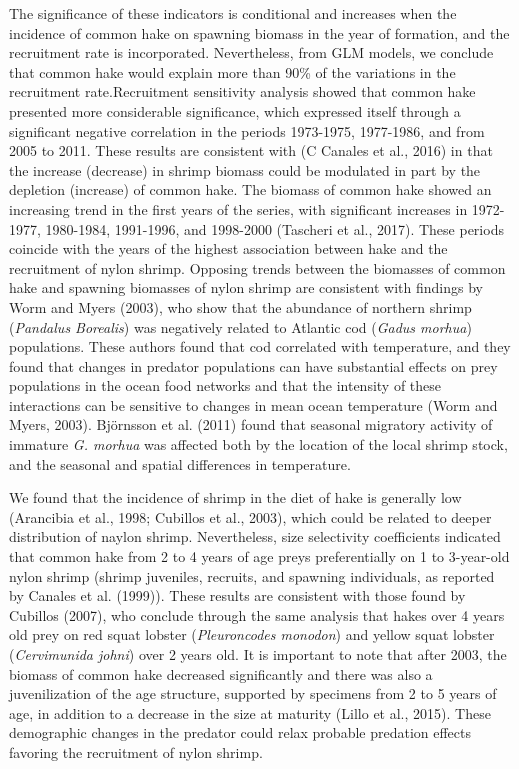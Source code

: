 \documentclass[12pt]{article}
\begin{document}
The significance of these indicators is conditional and increases when
the incidence of common hake on spawning biomass in the year of
formation, and the recruitment rate is incorporated. Nevertheless, from
GLM models, we conclude that common hake would explain more than 90\% of
the variations in the recruitment rate.Recruitment sensitivity analysis
showed that common hake presented more considerable significance, which
expressed itself through a significant negative correlation in the
periods 1973-1975, 1977-1986, and from 2005 to 2011. These results are
consistent with (C Canales et al., 2016) in that the increase (decrease)
in shrimp biomass could be modulated in part by the depletion (increase)
of common hake. The biomass of common hake showed an increasing trend in
the first years of the series, with significant increases in 1972-1977,
1980-1984, 1991-1996, and 1998-2000 (Tascheri et al., 2017). These
periods coincide with the years of the highest association between hake
and the recruitment of nylon shrimp. Opposing trends between the
biomasses of common hake and spawning biomasses of nylon shrimp are
consistent with findings by Worm and Myers (2003), who show that the
abundance of northern shrimp (\emph{Pandalus Borealis}) was negatively
related to Atlantic cod (\emph{Gadus morhua}) populations. These authors
found that cod correlated with temperature, and they found that changes
in predator populations can have substantial effects on prey populations
in the ocean food networks and that the intensity of these interactions
can be sensitive to changes in mean ocean temperature (Worm and Myers,
2003). Björnsson et al. (2011) found that seasonal migratory activity of
immature \emph{G. morhua} was affected both by the location of the local
shrimp stock, and the seasonal and spatial differences in temperature.

We found that the incidence of shrimp in the diet of hake is generally
low (Arancibia et al., 1998; Cubillos et al., 2003), which could be
related to deeper distribution of naylon shrimp. Nevertheless, size
selectivity coefficients indicated that common hake from 2 to 4 years of
age preys preferentially on 1 to 3-year-old nylon shrimp (shrimp
juveniles, recruits, and spawning individuals, as reported by Canales et
al. (1999)). These results are consistent with those found by Cubillos
(2007), who conclude through the same analysis that hakes over 4 years
old prey on red squat lobster (\emph{Pleuroncodes monodon}) and yellow
squat lobster (\emph{Cervimunida johni}) over 2 years old. It is
important to note that after 2003, the biomass of common hake decreased
significantly and there was also a juvenilization of the age structure,
supported by specimens from 2 to 5 years of age, in addition to a
decrease in the size at maturity (Lillo et al., 2015). These demographic
changes in the predator could relax probable predation effects favoring
the recruitment of nylon shrimp.
\end{document}
